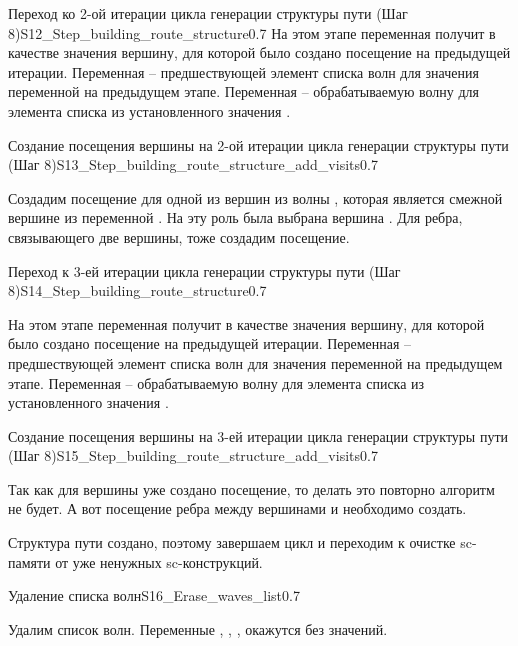\begin{itemize}
\begin{algostep}{Переход ко 2-ой итерации цикла генерации структуры
    пути (Шаг 8)}{S12_Step_building_route_structure}{0.7}
  На этом этапе переменная  получит в качестве
  значения вершину, для которой было создано посещение на предыдущей
  итерации. Переменная  – предшествующей элемент
  списка волн для значения переменной  на предыдущем
  этапе. Переменная  – обрабатываемую волну для
  элемента списка из установленного значения .
\end{algostep}


\begin{algostep}{Создание посещения вершины на 2-ой итерации цикла
    генерации структуры пути (Шаг
    8)}{S13_Step_building_route_structure_add_visits}{0.7}

  Создадим посещение для одной из вершин из волны ,
  которая является смежной вершине из переменной
  . На эту роль была выбрана вершина . Для
  ребра, связывающего две вершины, тоже создадим посещение.
\end{algostep}


\begin{algostep}{Переход к 3-ей итерации цикла генерации структуры пути
    (Шаг 8)}{S14_Step_building_route_structure}{0.7}
 
  На этом этапе переменная  получит в качестве
  значения вершину, для которой было создано посещение на предыдущей
  итерации. Переменная  – предшествующей элемент
  списка волн для значения переменной  на предыдущем
  этапе. Переменная  – обрабатываемую волну для
  элемента списка из установленного значения .
\end{algostep}


\begin{algostep}{Создание посещения вершины на 3-ей итерации цикла
    генерации структуры пути (Шаг
    8)}{S15_Step_building_route_structure_add_visits}{0.7}
 
  Так как для вершины  уже создано посещение, то делать это
  повторно алгоритм не будет. А вот посещение ребра между вершинами
   и  необходимо создать.

  Структура пути создано, поэтому завершаем цикл и переходим к очистке
  sc-памяти от уже ненужных sc-конструкций.
\end{algostep}

\begin{algostep}{Удаление списка волн}{S16_Erase_waves_list}{0.7}
 
  Удалим список волн. Переменные ,
  , ,
   окажутся без значений.
\end{algostep}



\end{itemize}

